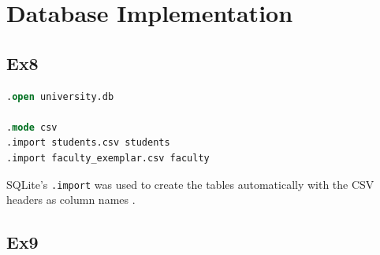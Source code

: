 \documentclass[12pt, a4paper]{report}
\begin{document}
\section{Database Implementation}
\subsection{Ex8}

\begin{lstlisting}[language=SQL, caption={ex8.sql - Import CSV files into SQLite}]
.open university.db

.mode csv
.import students.csv students
.import faculty_exemplar.csv faculty
\end{lstlisting}

SQLite's \texttt{.import} was used to create the tables automatically with the CSV headers as column names \cite{stackoverflow_sqlite_import}.

\subsection{Ex9}
\end{document}
